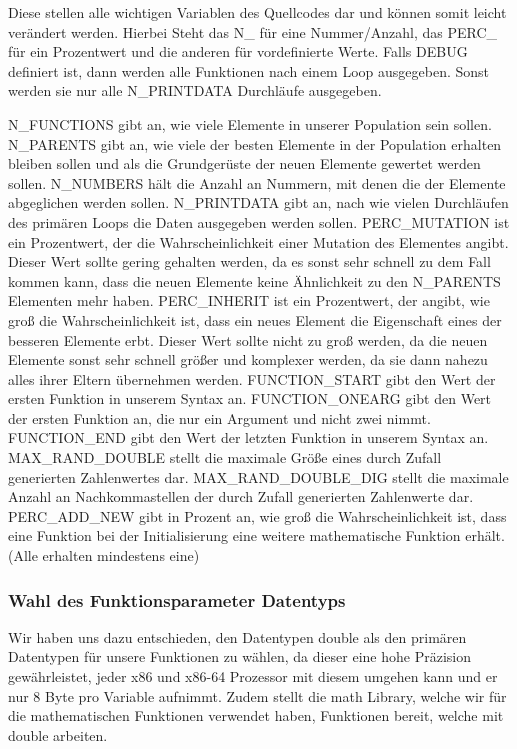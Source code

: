 \documentclass[a4paper,12pt]{article}
\begin{document}
Diese stellen alle wichtigen Variablen des Quellcodes dar und können somit leicht verändert werden. Hierbei Steht das N\_ für eine Nummer/Anzahl, das PERC\_ für ein Prozentwert und die anderen für vordefinierte Werte. Falls DEBUG definiert ist, dann werden alle Funktionen nach einem Loop ausgegeben. Sonst werden sie nur alle N\_PRINTDATA Durchläufe ausgegeben. 

N\_FUNCTIONS gibt an, wie viele Elemente in unserer Population sein sollen.
N\_PARENTS gibt an, wie viele der besten Elemente in der Population erhalten bleiben sollen und als die Grundgerüste der neuen Elemente gewertet werden sollen.
N\_NUMBERS hält die Anzahl an Nummern, mit denen die der Elemente abgeglichen werden sollen. 
N\_PRINTDATA gibt an, nach wie vielen Durchläufen des primären Loops die Daten ausgegeben werden sollen. 
PERC\_MUTATION ist ein Prozentwert, der die Wahrscheinlichkeit einer Mutation des Elementes angibt. Dieser Wert sollte gering gehalten werden, da es sonst sehr schnell zu dem Fall kommen kann, dass die neuen Elemente keine Ähnlichkeit zu den N\_PARENTS Elementen mehr haben. 
PERC\_INHERIT ist ein Prozentwert, der angibt, wie groß die Wahrscheinlichkeit ist, dass ein neues Element die Eigenschaft eines der besseren Elemente erbt. Dieser Wert sollte nicht zu groß werden, da die neuen Elemente sonst sehr schnell größer und komplexer werden, da sie dann nahezu alles ihrer Eltern übernehmen werden. 
FUNCTION\_START gibt den Wert der ersten Funktion in unserem Syntax an.
FUNCTION\_ONEARG gibt den Wert der ersten Funktion an, die nur ein Argument und nicht zwei nimmt. 
FUNCTION\_END gibt den Wert der letzten Funktion in unserem Syntax an.
MAX\_RAND\_DOUBLE stellt die maximale Größe eines durch Zufall generierten Zahlenwertes dar.
MAX\_RAND\_DOUBLE\_DIG stellt die maximale Anzahl an Nachkommastellen der durch Zufall generierten Zahlenwerte dar. 
PERC\_ADD\_NEW gibt in Prozent an, wie groß die Wahrscheinlichkeit ist, dass eine Funktion bei der Initialisierung eine weitere mathematische Funktion erhält. (Alle erhalten mindestens eine)

\subsubsection{Wahl des Funktionsparameter Datentyps}
Wir haben uns dazu entschieden, den Datentypen double als den primären Datentypen für unsere Funktionen zu wählen, da dieser eine hohe Präzision gewährleistet, jeder x86 und x86-64 Prozessor mit diesem umgehen kann und er nur 8 Byte pro Variable aufnimmt. Zudem stellt die math Library, welche wir für die mathematischen Funktionen verwendet haben, Funktionen bereit, welche mit double arbeiten. 
\end{document}
